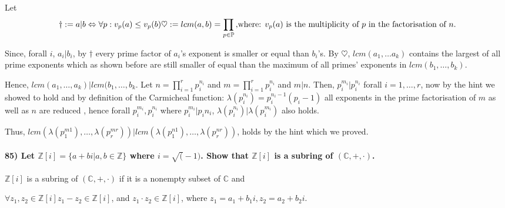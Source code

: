 \documentclass[
]{article}
\begin{document}
Let \[
\dagger := a|b \Leftrightarrow \forall p : v_p(a) \leq v_p(b) \\
\heartsuit := lcm(a,b) = \prod_{p \in \mathbb{P}} \\
\text{,where: } v_p(a) \text{ is the multiplicity of } p \text{ in the factorisation of } n. 
\]

Since, forall \(i\), \(a_i | b_i\), by \(\dagger\) every prime factor of
\(a_i\)'s exponent is smaller or equal than \(b_i\)'s. By
\(\heartsuit\), \(lcm(a_1, \dots a_k)\) contains the largest of all
prime exponents which as shown before are still smaller of equal than
the maximum of all primes' exponents in \(lcm(b_1, \dots, b_k)\).

Hence, \(lcm(a_1, \dots, a_k) | lcm(b_1, \dots, b_k\). Let
\(n = \prod_{i = 1}^{r} p_i^{n_i}\) and \(m = \prod_{i=1}^r p_i^{n_i}\)
and \(m | n\). Then, \(p_i^{m_i} | p_i^{n_i}\) forall
\(i = 1, \dots, r\), now by the hint we showed to hold and by definition
of the Carmicheal function:
\(\lambda(p_i^{n_i}) = p_i^{n_i-1} (p_i -1)\) all exponents in the prime
factorisation of \(m\) as well as \(n\) are reduced , hence forall
\(p_i^{m_i}, p_i^{n_i}\) where \(p_i^{m_i} | p_i{n_i}\),
\(\lambda(p_i^{n_i}) | \lambda(p_i^{m_i})\) also holds.

Thus,
\(lcm(\lambda(p_1^{m1}), \dots, \lambda(p_r^{mr})) | lcm(\lambda(p_1^{n1}) , \dots , \lambda(p_r^{nr}))\),
holds by the hint which we proved.

\hypertarget{let-mathbbzi-a-bi-ab-in-mathbbz-where-i-sqrt-1.-show-that-mathbbzi-is-a-subring-of-mathbbccdot.}{%
\paragraph{\texorpdfstring{85) Let
\(\mathbb{Z}[i] = \{a + bi | a,b \in \mathbb{Z}\}\) where
\(i = \sqrt(-1)\). Show that \(\mathbb{Z}[i]\) is a subring of
\((\mathbb{C},+,\cdot)\).}{85) Let \textbackslash mathbb\{Z\}{[}i{]} = \textbackslash\{a + bi \textbar{} a,b \textbackslash in \textbackslash mathbb\{Z\}\textbackslash\} where i = \textbackslash sqrt(-1). Show that \textbackslash mathbb\{Z\}{[}i{]} is a subring of (\textbackslash mathbb\{C\},+,\textbackslash cdot).}}\label{let-mathbbzi-a-bi-ab-in-mathbbz-where-i-sqrt-1.-show-that-mathbbzi-is-a-subring-of-mathbbccdot.}}

\(\mathbb{Z}[i]\) is a subring of \((\mathbb{C},+,\cdot)\) if it is a
nonempty subset of \(\mathbb{C}\) and

\(\forall z_1, z_2 \in \mathbb{Z}[i] z_1 - z_2 \in \mathbb{Z}[i]\), and
\(z_1 \cdot z_2 \in \mathbb{Z}[i]\), where
\(z_1 = a_1 + b_1i, z_2 = a_2 + b_2i\).
\end{document}
